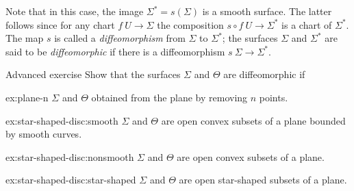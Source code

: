 Note that in this case, the image $\Sigma^{*}=s(\Sigma)$ is a smooth surface.
The latter follows since for any chart $f\:U\to \Sigma$ the composition $s\circ f\:U\to \Sigma^{*}$ is a chart of $\Sigma^{*}$. 
The map $s$ is called a \emph{diffeomorphism} from $\Sigma$ to $\Sigma^{*}$;
the surfaces $\Sigma$ and $\Sigma^{*}$ are said to be {}\emph{diffeomorphic} if there is a diffeomorphism $s\:\Sigma\to\Sigma^{*}$.


\begin{thm}{Advanced exercise}\label{ex:star-shaped-disc}
Show that the surfaces $\Sigma$ and $\Theta$ are diffeomorphic if

\begin{subthm}{ex:plane-n}
$\Sigma$ and $\Theta$ obtained from the plane by removing $n$ points.
\end{subthm}


\begin{subthm}{ex:star-shaped-disc:smooth}
$\Sigma$ and $\Theta$ are open convex subsets of a plane bounded by smooth curves.
\end{subthm}


\begin{subthm}{ex:star-shaped-disc:nonsmooth}
$\Sigma$ and $\Theta$ are open convex subsets of a plane.
\end{subthm}

\begin{subthm}{ex:star-shaped-disc:star-shaped}
$\Sigma$ and $\Theta$ are open star-shaped subsets of a plane.
\end{subthm}
\end{thm}

